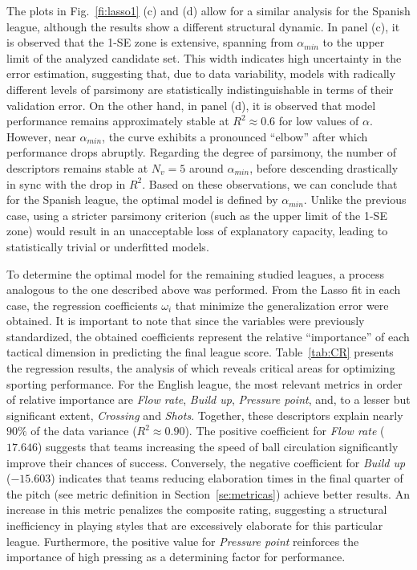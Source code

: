 \documentclass[preprint,12pt]{elsarticle}
\begin{document}
{The plots in Fig.~\ref{fi:lasso1} (c) and (d) allow for a similar analysis for the Spanish league, although the results show a different structural dynamic.
%
In panel (c), it is observed that the 1-SE zone is  extensive, spanning from $\alpha_{min}$ to the upper limit of the analyzed candidate set. This width indicates high uncertainty in the error estimation, suggesting that, due to data variability, models with radically different levels of parsimony are statistically indistinguishable in terms of their validation error.
%
On the other hand, in panel (d), it is observed that model performance remains approximately stable at $R^2 \approx 0.6$ for low values of $\alpha$. However, near $\alpha_{min}$, the curve exhibits a pronounced ``elbow'' after which performance drops abruptly. Regarding the degree of parsimony, the number of descriptors remains stable at $N_v=5$ around $\alpha_{min}$, before descending drastically in sync with the drop in $R^2$.
%
Based on these observations, we can conclude that for the Spanish league, the optimal model is defined by $\alpha_{min}$. Unlike the previous case, using a stricter parsimony criterion (such as the upper limit of the 1-SE zone) would result in an unacceptable loss of explanatory capacity, leading to statistically trivial or underfitted models.

To determine the optimal model for the remaining studied leagues, a process analogous to the one described above was performed. From the Lasso fit in each case, the regression coefficients $\omega_i$ that minimize the generalization error were obtained. It is important to note that since the variables were previously standardized, the obtained coefficients represent the relative ``importance'' of each tactical dimension in predicting the final league score.
%
Table~\ref{tab:CR} presents the regression results, the analysis of which reveals critical areas for optimizing sporting performance. For the English league, the most relevant metrics in order of relative importance are {\it Flow rate}, {\it Build up}, {\it Pressure point}, and, to a lesser but significant extent, {\it Crossing} and {\it Shots}. Together, these descriptors explain nearly $90\%$ of the data variance ($R^2 \approx 0.90$).
%
The positive coefficient for {\it Flow rate} ($17.646$) suggests that teams increasing the speed of ball circulation significantly improve their chances of success. Conversely, the negative coefficient for {\it Build up} ($-15.603$) indicates that teams reducing elaboration times in the final quarter of the pitch (see metric definition in Section~\ref{se:metricas}) achieve better results. An increase in this metric penalizes the composite rating, suggesting a structural inefficiency in playing styles that are excessively elaborate for this particular league. Furthermore, the positive value for {\it Pressure point} reinforces the importance of high pressing as a determining factor for performance.

}
\end{document}
